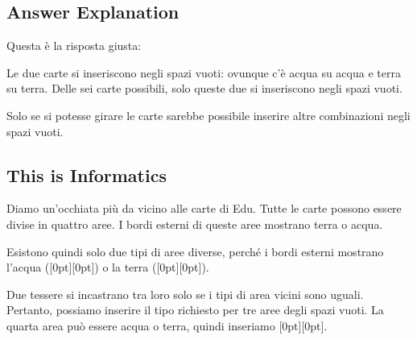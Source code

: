 \documentclass[a4paper,11pt]{report}
\newcommand{\taskGraphicsFolder}{..}
\begin{document}
\endgroup

\subsection*{Answer Explanation}

Questa è la risposta giusta:

{\centering%
\par}

Le due carte si inseriscono negli spazi vuoti: ovunque c’è acqua su acqua e terra su terra. Delle sei carte possibili, solo queste due si inseriscono negli spazi vuoti.

Solo se si potesse girare le carte sarebbe possibile inserire altre combinazioni negli spazi vuoti.


\subsection*{This is Informatics}

Diamo un’occhiata più da vicino alle carte di Edu. Tutte le carte possono essere divise in quattro aree. I bordi esterni di queste aree mostrano terra o acqua.

{\centering%
\par}

Esistono quindi solo due tipi di aree diverse, perché i bordi esterni mostrano l’acqua (\raisebox{-0.5ex}[0pt][0pt]{}) o la terra (\raisebox{-0.5ex}[0pt][0pt]{}).

{\centering%
\par}

Due tessere si incastrano tra loro solo se i tipi di area vicini sono uguali. Pertanto, possiamo inserire il tipo richiesto per tre aree degli spazi vuoti. La quarta area può essere acqua o terra, quindi inseriamo \raisebox{-0.5ex}[0pt][0pt]{}.
\end{document}
